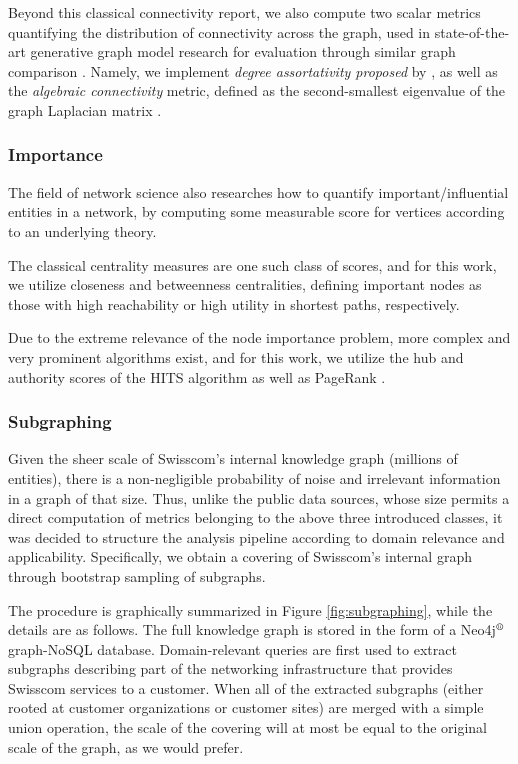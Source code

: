 Beyond this classical connectivity report, we also compute two scalar metrics quantifying the distribution of connectivity across the graph, used in state-of-the-art generative graph model research for evaluation through similar graph comparison \cite{krawczuk_gg-gan_2020}. Namely, we implement \emph{degree assortativity proposed} by \cite{newman_mixing_2003}, as well as the \emph{algebraic connectivity} metric, defined as the second-smallest eigenvalue of the graph Laplacian matrix \cite{chung_spectral_1996}.

\subsubsection{Importance}

The field of network science also researches how to quantify important/influential entities in a network, by computing some measurable score for vertices according to an underlying theory.

The classical centrality measures are one such class of scores, and for this work, we utilize closeness and betweenness centralities, defining important nodes as those with high reachability or high utility in shortest paths, respectively.

Due to the extreme relevance of the node importance problem, more complex and very prominent algorithms exist, and for this work, we utilize the hub and authority scores of the HITS algorithm \cite{kleinberg_authoritative_1999} as well as PageRank \cite{brin_anatomy_1998}.

\subsubsection{Subgraphing}

Given the sheer scale of Swisscom's internal knowledge graph (millions of entities), there is a non-negligible probability of noise and irrelevant information in a graph of that size. Thus, unlike the public data sources, whose size permits a direct computation of metrics belonging to the above three introduced classes, it was decided to structure the analysis pipeline according to domain relevance and applicability. Specifically, we obtain a covering of Swisscom's internal graph through bootstrap sampling of subgraphs. 

The procedure is graphically summarized in Figure \ref{fig:subgraphing}, while the details are as follows. The full knowledge graph is stored in the form of a Neo4j$\textsuperscript{\textregistered}$ graph-NoSQL database. Domain-relevant queries are first used to extract subgraphs describing part of the networking infrastructure that provides Swisscom services to a customer. When all of the extracted subgraphs (either rooted at customer organizations or customer sites) are merged with a simple union operation, the scale of the covering will at most be equal to the original scale of the graph, as we would prefer.

